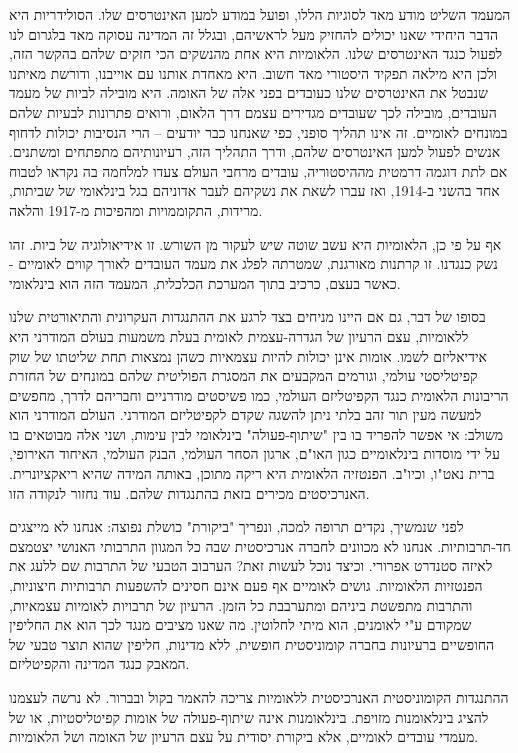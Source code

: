 המעמד השליט מודע מאד לסוגיות הללו, ופועל במודע למען האינטרסים שלו. הסולידריות היא הדבר היחידי שאנו יכולים להחזיק מעל לראשיהם, ובגלל זה המדינה עסוקה מאד בלגרום לנו לפעול כנגד האינטרסים שלנו. הלאומיות היא אחת מהנשקים הכי חזקים שלהם בהקשר הזה, ולכן היא מילאה תפקיד היסטורי מאד חשוב. היא מאחדת אותנו עם אוייבנו, ודורשת מאיתנו שנבטל את האינטרסים שלנו כעובדים בפני אלה של האומה. היא מובילה לביות של מעמד העובדים, מובילה לכך שעובדים מגדירים עצמם דרך הלאום, ורואים פתרונות לבעיות שלהם במונחים לאומיים. זה אינו תהליך סופני, כפי שאנחנו כבר יודעים – הרי הנסיבות יכולות לדחוף אנשים לפעול למען האינטרסים שלהם, ודרך התהליך הזה, רעיונותיהם מתפתחים ומשתנים. אם לתת דוגמה דרמטית מההיסטוריה, עובדים מרחבי העולם צעדו למלחמה בה נקראו לטבוח אחד בהשני ב-1914, ואז עברו לשאת את נשקיהם לעבר אדוניהם בגל בינלאומי של שביתות, מרידות, התקוממויות ומהפיכות מ-1917 והלאה.

אף על פי כן, הלאומיות היא עשב שוטה שיש לעקור מן השורש. זו אידיאולוגיה של ביות. זהו נשק כנגדנו. זו קרתנות מאורגנת, שמטרתה לפלג את מעמד העובדים לאורך קווים לאומיים - כאשר בעצם, כרכיב בתוך המערכת הכלכלית, המעמד הזה הוא בינלאומי.

בסופו של דבר, גם אם היינו מניחים בצד לרגע את ההתנגדות העקרונית והתיאורטית שלנו ללאומיות, עצם הרעיון של הגדרה-עצמית לאומית בעלת משמעות בעולם המודרני היא אידיאליזם לשמו. אומות אינן יכולות להיות עצמאיות כשהן נמצאות תחת שליטתו של שוק קפיטליסטי עולמי, וגורמים המקבעים את המסגרת הפוליטית שלהם במונחים של החזרת הריבונות הלאומית כנגד הקפיטליזם העולמי, כמו פשיסטים מודרניים וחבריהם לדרך, מחפשים למעשה מעין תור זהב בלתי ניתן להשגה שקדם לקפיטליזם המודרני. העולם המודרני הוא משולב: אי אפשר להפריד בו בין "שיתוף-פעולה" בינלאומי לבין עימות, ושני אלה מבוטאים בו על ידי מוסדות בינלאומיים כגון האו"ם, ארגון הסחר העולמי, הבנק העולמי, האיחוד האירופי, ברית נאט"ו, וכיו"ב. הפנטזיה הלאומית היא ריקה מתוכן, באותה המידה שהיא ריאקציונרית. האנרכיסטים מכירים בזאת בהתנגדות שלהם. עוד נחזור לנקודה הזו.

לפני שנמשיך, נקדים תרופה למכה, ונפריך "ביקורת" כושלת נפוצה: אנחנו לא מייצגים חד-תרבותיות. אנחנו לא מכוונים לחברה אנרכיסטית שבה כל המגוון התרבותי האנושי יצטמצם לאיזה סטנדרט אפרורי. וכיצד נוכל לעשות זאת? הערבוב הטבעי של התרבות שם ללעג את הפנטזיות הלאומיות. גושים לאומיים אף פעם אינם חסינים להשפעות תרבותיות חיצוניות, והתרבות מתפשטת ביניהם ומתערבבת כל הזמן. הרעיון של תרבויות לאומיות עצמאיות, שמקודם ע"י לאומנים, הוא מיתי לחלוטין. מה שאנו מציבים מנגד לכך הוא את החליפין החופשיים ברעיונות בחברה קומוניסטית חופשית, ללא מדינות, חליפין שהוא תוצר טבעי של המאבק כנגד המדינה והקפיטליזם.

ההתנגדות הקומוניסטית האנרכיסטית ללאומיות צריכה להאמר בקול ובברור. לא נרשה לעצמנו להציג בינלאומנות מזויפת. בינלאומנות אינה שיתוף-פעולה של אומות קפיטליסטיות, או של מעמדי עובדים לאומיים, אלא ביקורת יסודית על עצם הרעיון של האומה ושל הלאומיות.



